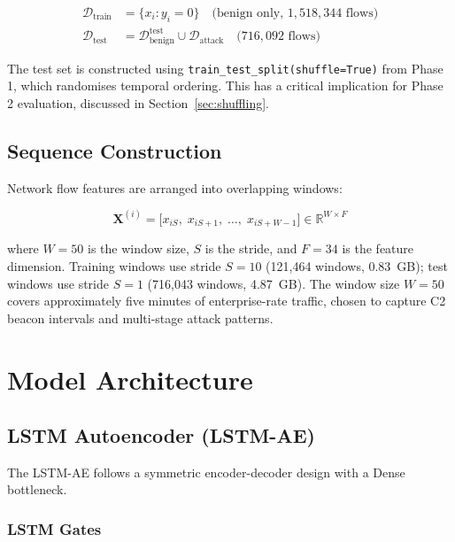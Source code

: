 \documentclass[conference]{IEEEtran}
\begin{document}
\begin{align}
  \mathcal{D}_\text{train} &= \{x_i : y_i = 0\} \quad \text{(benign only, } 1{,}518{,}344 \text{ flows)} \\
  \mathcal{D}_\text{test}  &= \mathcal{D}_\text{benign}^\text{test} \cup \mathcal{D}_\text{attack}
                               \quad \text{(}716{,}092 \text{ flows)}
\end{align}

The test set is constructed using \texttt{train\_test\_split(shuffle=True)} from Phase 1, which
randomises temporal ordering. This has a critical implication for Phase 2 evaluation, discussed
in Section~\ref{sec:shuffling}.

\subsection{Sequence Construction}

Network flow features are arranged into overlapping windows:

\begin{equation}
  \mathbf{X}^{(i)} = \bigl[x_{iS},\; x_{iS+1},\; \ldots,\; x_{iS+W-1}\bigr] \in \mathbb{R}^{W \times F}
\end{equation}

where $W=50$ is the window size, $S$ is the stride, and $F=34$ is the feature dimension.
Training windows use stride $S=10$ (121,464 windows, 0.83~GB); test windows use stride $S=1$
(716,043 windows, 4.87~GB). The window size $W=50$ covers approximately five minutes of
enterprise-rate traffic, chosen to capture C2 beacon intervals and multi-stage attack patterns.

\section{Model Architecture}

\subsection{LSTM Autoencoder (LSTM-AE)}

The LSTM-AE follows a symmetric encoder-decoder design with a Dense bottleneck.

\subsubsection{LSTM Gates}
\end{document}
